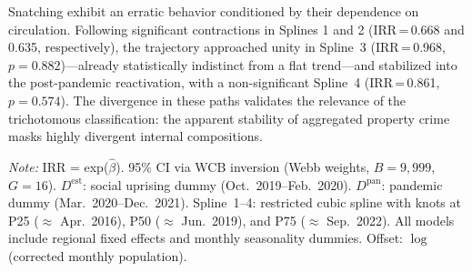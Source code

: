 \documentclass[pdflatex,sn-basic]{sn-jnl}
\newcommand{\tablenote}[1]{%
  \vspace{2pt}%
  {\par\footnotesize\textit{Note:} #1\par}%
}
\begin{document}
Snatching exhibit an erratic behavior conditioned by their dependence on circulation. Following significant contractions in Splines 1 and 2 (IRR\,=\,0.668 and 0.635, respectively), the trajectory approached unity in Spline~3 (IRR\,=\,0.968, $p=0.882$)---already statistically indistinct from a flat trend---and stabilized into the post-pandemic reactivation, with a non-significant Spline~4 (IRR\,=\,0.861, $p=0.574$). The divergence in these paths validates the relevance of the trichotomous classification: the apparent stability of aggregated property crime masks highly divergent internal compositions.

\begin{table}[htbp]
\centering
\caption{Poisson-QMLE model with Wild Cluster Bootstrap: main results (C3)}
\label{tab:poisson}
\footnotesize
{}
\tablenote{IRR = exp($\hat{\beta}$). 95\% CI via WCB inversion (Webb weights, $B=9,999$, $G=16$). $D^{\text{est}}$: social uprising dummy (Oct.\ 2019--Feb.\ 2020). $D^{\text{pan}}$: pandemic dummy (Mar.\ 2020--Dec.\ 2021). Spline~1--4: restricted cubic spline with knots at P25 ($\approx$ Apr.\ 2016), P50 ($\approx$ Jun.\ 2019), and P75 ($\approx$ Sep.\ 2022). All models include regional fixed effects and monthly seasonality dummies. Offset: $\log$(corrected monthly population).}
\end{table}
\end{document}
